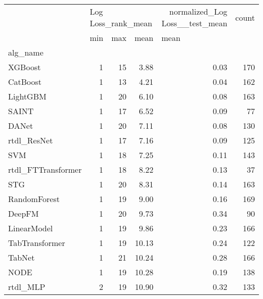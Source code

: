 \begin{tabular}{lrrrrr}
\toprule
{} & \multicolumn{3}{l}{Log Loss_rank_mean} & normalized_Log Loss__test_mean & count \\
{} &                min & max &   mean & \multicolumn{2}{l}{mean} \\
alg_name           &                    &     &        &                                &       \\
\midrule
XGBoost            &                  1 &  15 &   3.88 &                           0.03 &   170 \\
CatBoost           &                  1 &  13 &   4.21 &                           0.04 &   162 \\
LightGBM           &                  1 &  20 &   6.10 &                           0.08 &   163 \\
SAINT              &                  1 &  17 &   6.52 &                           0.09 &    77 \\
DANet              &                  1 &  20 &   7.11 &                           0.08 &   130 \\
rtdl_ResNet        &                  1 &  17 &   7.16 &                           0.09 &   125 \\
SVM                &                  1 &  18 &   7.25 &                           0.11 &   143 \\
rtdl_FTTransformer &                  1 &  18 &   8.22 &                           0.13 &    37 \\
STG                &                  1 &  20 &   8.31 &                           0.14 &   163 \\
RandomForest       &                  1 &  19 &   9.00 &                           0.16 &   169 \\
DeepFM             &                  1 &  20 &   9.73 &                           0.34 &    90 \\
LinearModel        &                  1 &  19 &   9.86 &                           0.23 &   166 \\
TabTransformer     &                  1 &  19 &  10.13 &                           0.24 &   122 \\
TabNet             &                  1 &  21 &  10.24 &                           0.28 &   166 \\
NODE               &                  1 &  19 &  10.28 &                           0.19 &   138 \\
rtdl_MLP           &                  2 &  19 &  10.90 &                           0.32 &   133 \\

\end{tabular}
